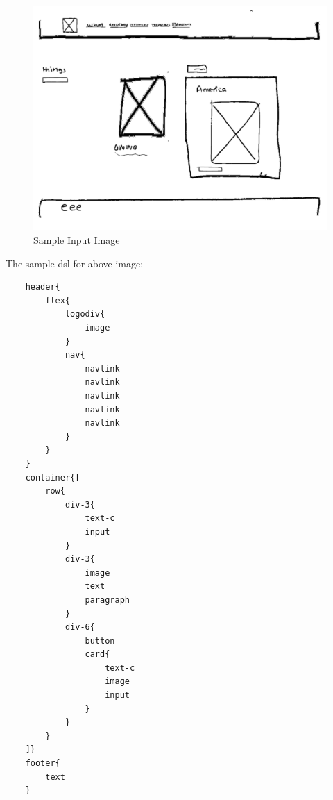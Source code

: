     \begin{figure}[H]
        \includegraphics[scale=.6]{images/sample image.png}
        \caption{Sample Input Image}
        \label{fig:lsamp}
    \end{figure}




The sample \gls{dsl} for above image:




\begin{verbatim}
    header{
        flex{
            logodiv{
                image
            }
            nav{
                navlink
                navlink
                navlink
                navlink
                navlink
            }
        }
    }
    container{[
        row{
            div-3{
                text-c
                input
            }
            div-3{
                image
                text
                paragraph
            }
            div-6{
                button
                card{
                    text-c
                    image
                    input
                }
            }
        }
    ]}
    footer{
        text
    }
    \end{verbatim}

